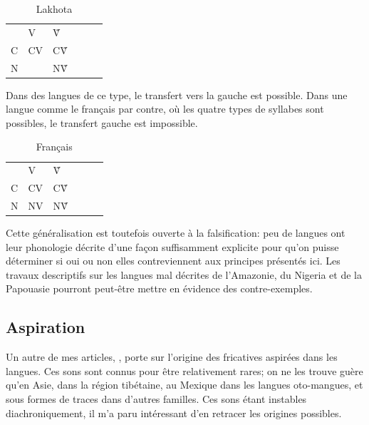 \documentclass[oldfontcommands,oneside,a4paper,11pt]{memoir}
\begin{document}
\begin{table}[h]
\caption{Lakhota}
\centering
\begin{tabular}{llllll}  \toprule \
& V & Ṽ \\
C &  CV &CṼ\\
N & & NṼ\\
\bottomrule
\end{tabular}
\end{table}

Dans des langues de ce type, le transfert vers la gauche est possible. Dans une langue comme le français par contre, où les quatre types de syllabes sont possibles, le transfert gauche est impossible.
\begin{table}[h]
\caption{Français}
\centering
\begin{tabular}{llllll}  \toprule \
& V & Ṽ \\
C &  CV &CṼ\\
N & NV& NṼ\\
\bottomrule
\end{tabular}
\end{table}



Cette généralisation est toutefois ouverte à la falsification: peu de langues ont leur phonologie décrite d'une façon suffisamment explicite pour qu'on puisse déterminer si oui ou non elles contreviennent aux principes présentés ici. Les travaux descriptifs sur les langues mal décrites de l'Amazonie, du Nigeria et de la Papouasie pourront peut-être mettre en évidence des contre-exemples.

\subsection{Aspiration}
Un autre de mes articles, \citet{jacques11lingua}, porte sur l'origine des fricatives aspirées dans les langues. Ces sons sont connus pour être relativement rares; on ne les trouve guère qu'en Asie, dans la région tibétaine, au Mexique dans les langues oto-mangues, et sous formes de traces dans d'autres familles. Ces sons étant instables diachroniquement, il m'a paru intéressant d'en retracer les origines possibles. 
\end{document}

